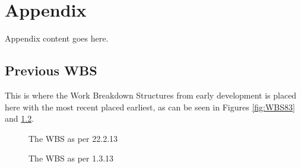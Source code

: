 \appendix

\chapter{Appendix}
Appendix content goes here.
\section{Previous WBS}
This is where the Work Breakdown Structures from early development is placed here with the most recent placed earliest, as can be seen in Figures \ref{fig:WBS83} and \ref{fig:WBS13}.

\begin{figure}[p]
\setlength\fboxsep{0pt}
\setlength\fboxrule{1pt}\noindent{}
\caption{The WBS as per 22.2.13 }
\label{fig:WBS222}
\end{figure}

\begin{figure}[p]
\setlength\fboxsep{0pt}
\setlength\fboxrule{1pt}\noindent{}
\caption{The WBS as per 1.3.13}
\label{fig:WBS13}
\end{figure}



